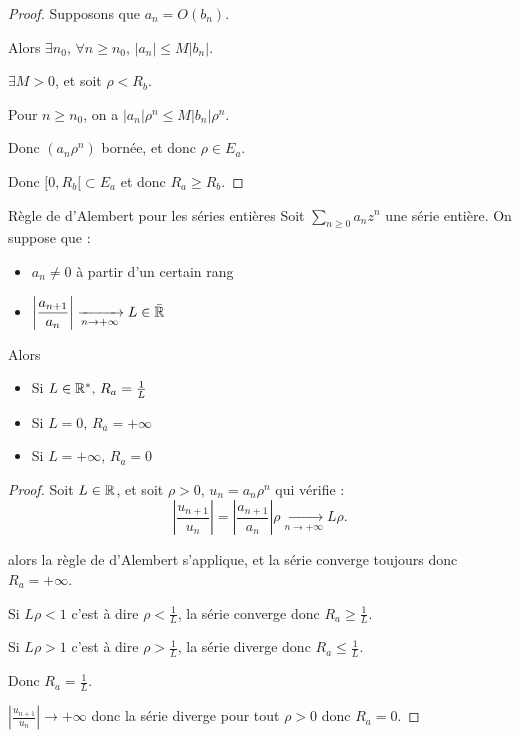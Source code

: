 
\begin{proof}
    Supposons que $a_n = O(b_n)$. 

    Alors $\exists n_0, \, \forall n \geqslant n_0, \, |a_n| \leqslant M |b_n|$.

    $\exists M > 0$, et soit $\rho < R_b$. 

    Pour $n \geqslant n_0$, on a $|a_n| \rho^n \leqslant M |b_n| \rho^n$.

    Donc $(a_n \rho^n)$ bornée, et donc $\rho \in E_a$.

    Donc $[0, R_b[ \subset E_a$ et donc $R_a \geqslant R_b$.
\end{proof}



\begin{theoreme}{Règle de d'Alembert pour les séries entières}{}
    Soit $\sum_{n \geqslant 0} a_n z^n$ une série entière. On suppose que : 
    \begin{itemize}
        \item $a_n \neq 0$ à partir d'un certain rang
        \item $\displaystyle \left| \frac{a_{n + 1 }}{a_n } \right| \xrightarrow[n \to + \infty   ]{} L \in \bar {\mathbb{R}}$ 
    \end{itemize}

    Alors 
    \begin{itemize}
        \item Si $L \in \mathbb{R}^*, \, R_a = \frac 1 L$
        \item Si $L = 0, \, R_a = +\infty$
        \item Si $L = +\infty, \, R_a = 0$
    \end{itemize}
\end{theoreme}


\begin{proof}
    Soit $L \in \mathbb{R}$, et soit $\rho > 0$, $u_n = a_n \rho^n$ qui vérifie :
    \[
        \left| \frac{u_{n + 1}}{u_n} \right| = \left| \frac{a_{n + 1}}{a_n} \right| \rho \xrightarrow[n \to + \infty ]{} L \rho.
    \]

     alors la règle de d'Alembert s'applique, et la série converge toujours 
    donc $R_a = +\infty$.

    
    \avspace Si $L \rho < 1$ c'est à dire $\rho < \frac 1 L$, la série converge donc $R_a \geqslant \frac 1 L$.

    Si $L \rho > 1$ c'est à dire $\rho > \frac 1 L$, la série diverge donc $R_a \leqslant \frac 1 L$.

    Donc $R_a = \frac 1 L$.


    \avspace $\displaystyle \left| \frac{u_{n + 1}}{u_n } \right| \to + \infty$ donc la série diverge 
    pour tout $\rho > 0$ donc $R_a = 0$.
\end{proof}

